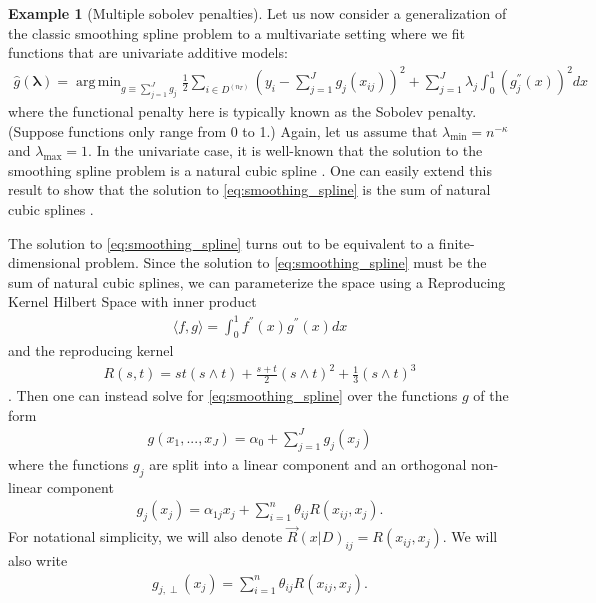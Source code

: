 \documentclass[12pt]{article} %
\theoremstyle{definition}
\newtheorem{example}{Example}
\DeclareMathOperator*{\argmin}{arg\,min}
\begin{document}
\begin{example}[Multiple sobolev penalties]
	Let us now consider a generalization of the classic smoothing spline problem to a multivariate setting where we fit functions that are univariate additive models:
	\begin{align}
	\hat{g}(\boldsymbol{\lambda})
	= \argmin_{g \equiv \sum_{j=1}^J g_j}
	\frac{1}{2} \sum_{i\in D^{(n_T)}}
	\left(
	y_i - \sum_{j=1}^J g_j(x_{ij})
	\right)^2
	+ \sum_{j=1}^{J} \lambda_j \int_0^1 \left(g_j^{''}(x)\right)^{2} dx
	\label{eq:smoothing_spline}
	\end{align}
	where the functional penalty here is typically known as the Sobolev penalty.
	(Suppose functions only range from 0 to 1.)
	Again, let us assume that $\lambda_{\min} = n^{-\kappa}$ and $\lambda_{\max} = 1$.
	In the univariate case, it is well-known that the solution to the smoothing spline problem is a natural cubic spline \citep{green1993nonparametric, o1986automatic}.
	One can easily extend this result to show that the solution to \eqref{eq:smoothing_spline} is the sum of natural cubic splines \citep{buja1989linear}.

	The solution to \eqref{eq:smoothing_spline} turns out to be equivalent to a finite-dimensional problem.
	Since the solution to \eqref{eq:smoothing_spline} must be the sum of natural cubic splines, we can parameterize the space using a Reproducing Kernel Hilbert Space with inner product
	\begin{align}
	\langle f, g \rangle = \int_{0}^1 f^{''}(x) g^{''}(x) dx
	\end{align}
	and the reproducing kernel
	\begin{align}
	R(s, t) = st(s \wedge t)
	+ \frac{s + t}{2} (s \wedge t)^2
	+ \frac{1}{3}
	(s \wedge t)^3
	\end{align}
	\citep{heckman2012theory}.
	Then one can instead solve for \eqref{eq:smoothing_spline} over the functions $g$ of the form
	\begin{align}
	g(x_1,..., x_J) = \alpha_0 + \sum_{j=1}^J g_j(x_j)
	\end{align}
	where the functions $g_j$ are split into a linear component and an orthogonal non-linear component
	\begin{align}
	g_j(x_j) = \alpha_{1j} x_j + \sum_{i=1}^n \theta_{ij} R(x_{ij}, x_j).
	\end{align}
	For notational simplicity, we will also denote $\vec{R}(x | D)_{ij} = R(x_{ij}, x_j)$.
	We will also write
	\begin{align}
	g_{j, \perp}(x_j) = \sum_{i=1}^n \theta_{ij} R(x_{ij}, x_j).
	\end{align}


\end{example}
\end{document}
